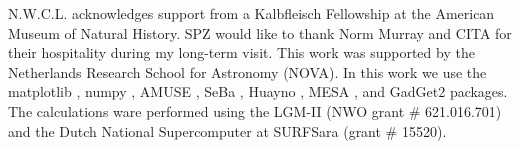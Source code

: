 \documentclass[twocolumn]{aastex62}
\begin{document}
\acknowledgments

N.W.C.L. acknowledges support from a Kalbfleisch Fellowship at the
American Museum of Natural History.  SPZ would like to thank Norm
Murray and CITA for their hospitality during my long-term visit.  This
work was supported by the Netherlands Research School for Astronomy
(NOVA). 
In this work we use the matplotlib
\citep{2007CSE.....9...90H}, numpy
\citep{Oliphant2006ANumPy}, AMUSE
\citep{portegies_zwart_simon_2018_1443252}, SeBa
\citep{2012ascl.soft01003P}, Huayno \citep{2012NewA...17..711P}, MESA
\citep{2010ascl.soft10083P}, and GadGet2 \citep{2000ascl.soft03001S}
packages. The calculations ware performed using the LGM-II (NWO grant
\# 621.016.701) and the Dutch National Supercomputer at SURFSara
(grant \# 15520).





%
% 
%      
\end{document}
